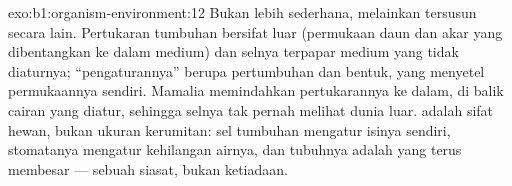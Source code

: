 \begin{solution}{exo:b1:organism-environment:12}
Bukan lebih sederhana, melainkan tersusun secara lain. Pertukaran
tumbuhan bersifat luar (permukaan daun dan akar yang dibentangkan ke
dalam medium) dan selnya terpapar medium yang tidak diaturnya;
``pengaturannya'' berupa pertumbuhan dan bentuk, yang menyetel
permukaannya sendiri. Mamalia memindahkan pertukarannya ke dalam, di
balik cairan yang diatur, sehingga selnya tak pernah melihat dunia luar.
 adalah sifat  hewan, bukan ukuran
kerumitan: sel tumbuhan mengatur isinya sendiri, stomatanya mengatur
kehilangan airnya, dan tubuhnya adalah  yang terus
membesar --- sebuah siasat, bukan ketiadaan.
\end{solution}

